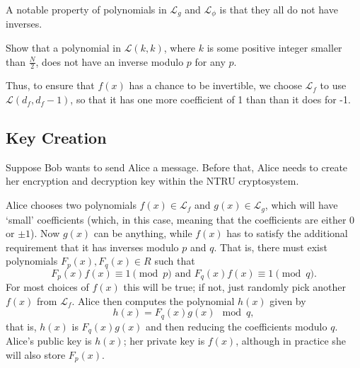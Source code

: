 A notable property of polynomials in $\mathcal{L}_g$ and $\mathcal{L}_\phi$ is that they all do not have inverses.
\begin{exercise}
    Show that a polynomial in $\mathcal{L}(k,k)$, where $k$ is some positive integer smaller than $\frac N2$, does not have an inverse modulo $p$ for any $p$.
\end{exercise}
Thus, to ensure that $f(x)$ has a chance to be invertible, we choose $\mathcal{L}_f$ to use $ \mathcal{L}(d_f, d_f-1)$, so that it has one more coefficient of 1 than than it does for -1.

\subsection{Key Creation}
Suppose Bob wants to send Alice a message. Before that, Alice needs to create her encryption and decryption key within the NTRU cryptosystem.

Alice chooses two polynomials $f(x) \in \mathcal{L}_f$ and $g(x) \in \mathcal{L}_g$, which will have `small' coefficients (which, in this case, meaning that the coefficients are either 0 or $\pm1$). Now $g(x)$ can be anything, while $f(x)$ has to satisfy the additional requirement that it has inverses modulo $p$ and $q$. That is, there must exist polynomials $F_p(x), F_q(x) \in R$ such that
\[
    F_p(x)f(x) \equiv 1 \pmod p \text{ and } F_q(x)f(x) \equiv 1 \pmod q.
\]
For most choices of $f(x)$ this will be true; if not, just randomly pick another $f(x)$ from $\mathcal{L}_f$. Alice then computes the polynomial $h(x)$ given by
\[
    h(x) = F_q(x)g(x) \mod q,
\]
that is, $h(x)$ is $F_q(x)g(x)$ and then reducing the coefficients modulo $q$. Alice's public key is $h(x)$; her private key is $f(x)$, although in practice she will also store $F_p(x)$.

